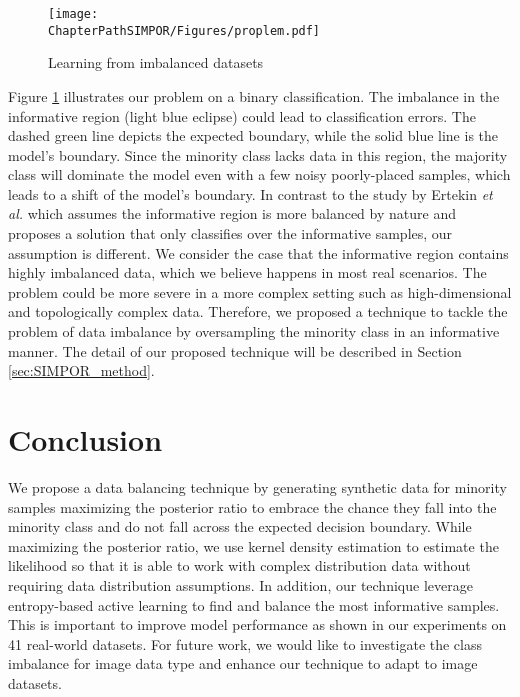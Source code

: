 \begin{figure}[t!]
	\texttt{[image: \\ChapterPathSIMPOR/Figures/proplem.pdf]}
	\caption{Learning from imbalanced datasets}
	\label{fig:problem}
\end{figure}

Figure \ref{fig:problem} illustrates our problem on a binary classification. The imbalance in the informative region (light blue eclipse) could lead to classification errors. The dashed green line depicts the expected boundary, while the solid blue line is the model's boundary. Since the minority class lacks data in this region, the majority class will dominate the model even with a few noisy poorly-placed samples, which leads to a shift of the model's boundary. In contrast to the study by Ertekin \textit{et al.} \cite{ertekin_learning_2007} which assumes the informative region is more balanced by nature and proposes a solution that only classifies over the informative samples, our assumption is different. We consider the case that the informative region contains highly imbalanced data, which we believe happens in most real scenarios. The problem could be more severe in a more complex setting such as high-dimensional and topologically complex data. Therefore, we proposed a technique to tackle the problem of data imbalance by oversampling the minority class in an informative manner. The detail of our proposed technique will be described in Section \ref{sec:SIMPOR_method}.   
       












\section {Conclusion}
\label{sec:conclusion}
We propose a data balancing technique by generating synthetic data for minority samples maximizing the posterior ratio to embrace the chance they fall into the minority class and do not fall across the expected decision boundary. While maximizing the posterior ratio, we use kernel density estimation to estimate the likelihood so that it is able to work with complex distribution data without requiring data distribution assumptions. In addition, our technique leverage entropy-based active learning to find and balance the most informative samples. This is important to improve model performance as shown in our experiments on 41 real-world datasets. For future work, we would like to investigate the class imbalance for image data type and enhance our technique to adapt to image datasets.     

